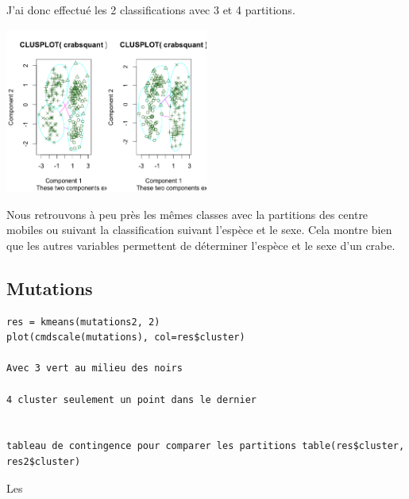 \documentclass[a4paper,12pt]{report}
\begin{document}
J'ai donc effectué les 2 classifications avec 3 et 4 partitions. 

\includegraphics[width=0.5\textwidth]{ex2_crab_4.png}

Nous retrouvons à peu près les mêmes classes avec la partitions des centre mobiles ou suivant la classification suivant l'espèce et le sexe. Cela montre bien que les autres variables permettent de déterminer l'espèce et le sexe d'un crabe. 

\subsection*{Mutations}
\begin{verbatim}
res = kmeans(mutations2, 2)
plot(cmdscale(mutations), col=res$cluster)

Avec 3 vert au milieu des noirs 

4 cluster seulement un point dans le dernier


tableau de contingence pour comparer les partitions table(res$cluster, res2$cluster)
\end{verbatim}

Les
\end{document}
